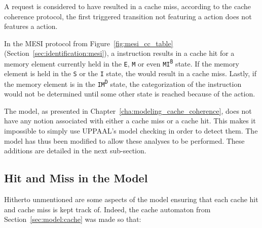 \begin{definition}
\label{def:cache_miss}
A request is considered to have resulted in a cache miss, according to the
cache coherence protocol, the first triggered transition not featuring a
\stallact{} action does not features a \hitact{} action.
\end{definition}
\begin{example}
In the MESI protocol from Figure~\ref{fig:mesi_cc_table}
(Section~\ref{sec:identification:mesi}), a \storeinstr{} instruction results in
a cache hit for a memory element currently held in the \texttt{E}, \texttt{M}
or even \texttt{MI\textsuperscript{B}} state. If the memory
element is held in the \texttt{S} or the \texttt{I} state, the \storeinstr{}
would result in a cache miss. Lastly, if the memory element is in the
\texttt{IM\textsuperscript{D}} state, the categorization of the \storeinstr{}
instruction would not be determined until some other state is reached because
of the \stallact{} action.
\end{example}

The model, as presented in Chapter~\ref{cha:modeling_cache_coherence}, does not
have any notion associated with either a cache miss or a cache hit.  This makes
it impossible to simply use UPPAAL's model checking in order to detect them.
The model has thus been modified to allow these analyses to be performed. These
additions are detailed in the next sub-section.

\subsection{Hit and Miss in the Model}
\label{sec:analyzing:hit_miss_mod}
Hitherto unmentioned are some aspects of the model ensuring that each
cache hit and cache miss is kept track of. Indeed, the cache automaton from
Section~\ref{sec:model:cache} was made so that:
